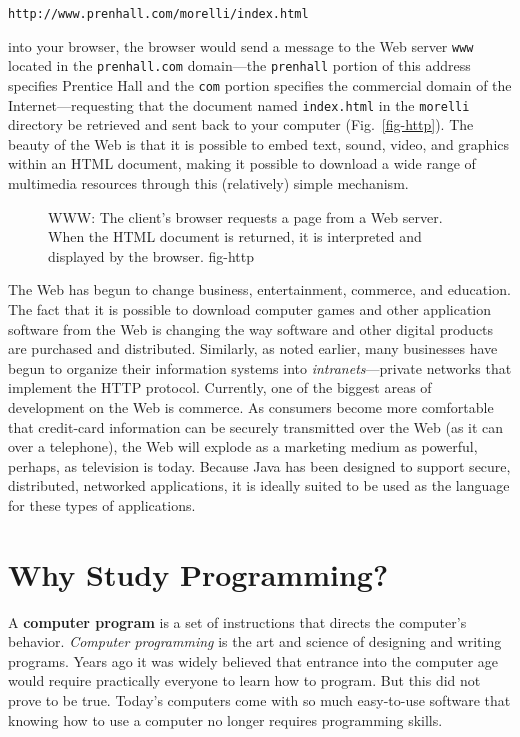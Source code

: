 \WWW
\begin{jjjlisting}
\begin{lstlisting}[commentstyle=\color{black}\small]
http://www.prenhall.com/morelli/index.html
\end{lstlisting}
\end{jjjlisting}

\noindent into your browser, the browser would send a message to the
Web server {\tt www} located in the {\tt prenhall.com} domain---the
{\tt prenhall} portion of this address specifies Prentice Hall and
the {\tt com} portion specifies the commercial domain of the
Internet---requesting that the document named \mbox{\tt index.html} 
in the {\tt morelli}
directory be retrieved and sent back to your computer
(Fig.~\ref{fig-http}). The beauty of the Web is that it is possible
to embed text, sound, video, and graphics within an HTML document,
making it possible to download a wide range of multimedia resources
through this (relatively) simple mechanism.

\begin{figure}[tb]
{WWW: The client's browser requests a page from
a Web server.  When the HTML document is returned, it is
interpreted and displayed by the browser.
} {fig-http}
\end{figure}

The Web has begun to change business, entertainment, commerce, and
education.  The fact that it is possible to download computer games
and other application software from the Web is changing the way software
and other digital products are purchased and distributed.  Similarly,
as noted earlier, many businesses have begun to organize their
information systems into {\em intranets}---private networks that implement
the HTTP protocol.  Currently, one of the biggest areas of development
on the Web is commerce.  As consumers become more comfortable
that credit-card information can be securely transmitted over the Web (as
it can over a telephone), the Web will explode as a marketing medium
as powerful, perhaps, as television is today.  Because Java has been
designed to support secure, distributed, networked applications, it is
ideally suited to be used as the language for these types of
applications.

\section{Why Study Programming?}
\label{why-study-programming}
\noindent A {\bf computer program} is a set of instructions that directs
the computer's behavior.  {\it Computer programming} is the art and
science of designing and writing programs.  Years ago it was widely
believed that entrance into the computer age would require practically
everyone to learn how to program.  But this did not prove to be true.
Today's computers come with so much easy-to-use software that knowing
how to use a computer no longer requires programming skills.


